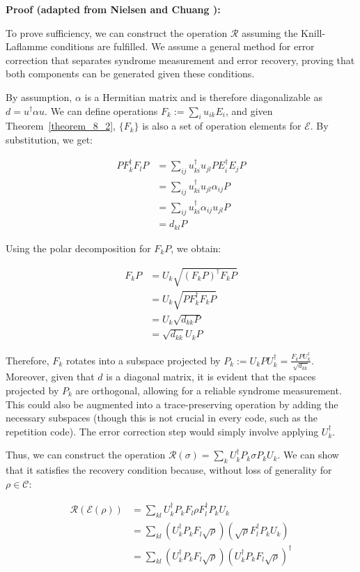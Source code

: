 \textbf{Proof (adapted from Nielsen and Chuang \citep{Nielsen2010}):}

To prove sufficiency, we can construct the operation $\mathcal{R}$ assuming the Knill-Laflamme conditions are fulfilled. We assume a general method for error correction that separates syndrome measurement and error recovery, proving that both components can be generated given these conditions.

By assumption, $\alpha$ is a Hermitian matrix and is therefore diagonalizable as $d = u^\dagger \alpha u$. We can define operations $F_k := \sum_{i} u_{ik} E_i$, and given Theorem~\ref{theorem_8_2}, $\{F_k\}$ is also a set of operation elements for $\mathcal{E}$. By substitution, we get:

\begin{align*}
P F^{\dagger}_k F_l P &= \sum_{ij} u_{ki}^\dagger u_{jl} P E_i^\dagger E_j P\\
&= \sum_{ij} u_{ki}^\dagger u_{jl} \alpha_{ij} P\\
&= \sum_{ij} u_{ki}^\dagger \alpha_{ij} u_{jl} P\\
&= d_{kl} P
\end{align*}

Using the polar decomposition for $F_k P$, we obtain:

\begin{align*}
F_k P &= U_k\sqrt{(F_k P)^\dagger F_k P}\\
&= U_k\sqrt{P F_k^\dagger F_k P}\\
&= U_k\sqrt{d_{kk} P}\\
&= \sqrt{d_{kk}} U_k P
\end{align*}

Therefore, $F_k$ rotates into a subspace projected by $P_k := U_k P U_k^\dagger = \frac{F_k P U_k^\dagger}{\sqrt{d_{kk}}}$. Moreover, given that $d$ is a diagonal matrix, it is evident that the spaces projected by $P_k$ are orthogonal, allowing for a reliable syndrome measurement. This could also be augmented into a trace-preserving operation by adding the necessary subspaces (though this is not crucial in every code, such as the repetition code). The error correction step would simply involve applying $U^\dagger_k$.

Thus, we can construct the operation $\mathcal{R}(\sigma) = \sum_k U_k^\dagger P_k \sigma P_k U_k$. We can show that it satisfies the recovery condition because, without loss of generality for $\rho \in \mathcal{C}$:

\begin{align*}
\mathcal{R}(\mathcal{E}(\rho)) &= \sum_{kl} U_k^\dagger P_k F_l \rho F_l^\dagger P_k U_k\\
&=\sum_{kl} \left(U_k^\dagger P_k F_l \sqrt{\rho}\right) \left(\sqrt{\rho} F_l^\dagger P_k U_k\right)\\
&=\sum_{kl} \left(U_k^\dagger P_k F_l \sqrt{\rho}\right) \left(U_k^\dagger P_k F_l \sqrt{\rho}\right)^\dagger
\end{align*}


